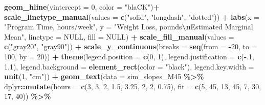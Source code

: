 \documentclass[
]{article}
\newenvironment{Shaded}{\begin{snugshade}}{\end{snugshade}}
\newcommand{\AttributeTok}[1]{\textcolor[rgb]{0.13,0.29,0.53}{#1}}
\newcommand{\ConstantTok}[1]{\textcolor[rgb]{0.56,0.35,0.01}{#1}}
\newcommand{\DecValTok}[1]{\textcolor[rgb]{0.00,0.00,0.81}{#1}}
\newcommand{\FloatTok}[1]{\textcolor[rgb]{0.00,0.00,0.81}{#1}}
\newcommand{\FunctionTok}[1]{\textcolor[rgb]{0.13,0.29,0.53}{\textbf{#1}}}
\newcommand{\NormalTok}[1]{#1}
\newcommand{\SpecialCharTok}[1]{\textcolor[rgb]{0.81,0.36,0.00}{\textbf{#1}}}
\newcommand{\StringTok}[1]{\textcolor[rgb]{0.31,0.60,0.02}{#1}}
\begin{document}
\begin{Shaded}
\begin{Highlighting}[]
  \FunctionTok{geom\_hline}\NormalTok{(}\AttributeTok{yintercept =} \DecValTok{0}\NormalTok{,}
             \AttributeTok{color =} \StringTok{"blaCK"}\NormalTok{)}\SpecialCharTok{+}
  \FunctionTok{scale\_linetype\_manual}\NormalTok{(}\AttributeTok{values =} \FunctionTok{c}\NormalTok{(}\StringTok{"solid"}\NormalTok{, }\StringTok{"longdash"}\NormalTok{, }\StringTok{"dotted"}\NormalTok{)) }\SpecialCharTok{+}
  \FunctionTok{labs}\NormalTok{(}\AttributeTok{x =} \StringTok{"Program Time, hours/week"}\NormalTok{,}
       \AttributeTok{y =} \StringTok{"Weight Loss, pounds}\SpecialCharTok{\textbackslash{}n}\StringTok{Estimated Marginal Mean"}\NormalTok{,}
       \AttributeTok{linetype =} \ConstantTok{NULL}\NormalTok{,}
       \AttributeTok{fill =} \ConstantTok{NULL}\NormalTok{)  }\SpecialCharTok{+}
  \FunctionTok{scale\_fill\_manual}\NormalTok{(}\AttributeTok{values =} \FunctionTok{c}\NormalTok{(}\StringTok{"gray20"}\NormalTok{, }\StringTok{"gray90"}\NormalTok{)) }\SpecialCharTok{+}
  \FunctionTok{scale\_y\_continuous}\NormalTok{(}\AttributeTok{breaks =} \FunctionTok{seq}\NormalTok{(}\AttributeTok{from =} \SpecialCharTok{{-}}\DecValTok{20}\NormalTok{, }\AttributeTok{to =} \DecValTok{100}\NormalTok{, }\AttributeTok{by =} \DecValTok{20}\NormalTok{)) }\SpecialCharTok{+}
  \FunctionTok{theme}\NormalTok{(}\AttributeTok{legend.position =} \FunctionTok{c}\NormalTok{(}\DecValTok{0}\NormalTok{, }\DecValTok{1}\NormalTok{),}
        \AttributeTok{legend.justification =} \FunctionTok{c}\NormalTok{(}\SpecialCharTok{{-}}\NormalTok{.}\DecValTok{1}\NormalTok{, }\FloatTok{1.1}\NormalTok{),}
        \AttributeTok{legend.background =} \FunctionTok{element\_rect}\NormalTok{(}\AttributeTok{color =} \StringTok{"black"}\NormalTok{),}
        \AttributeTok{legend.key.width =} \FunctionTok{unit}\NormalTok{(}\DecValTok{1}\NormalTok{, }\StringTok{"cm"}\NormalTok{)) }\SpecialCharTok{+}
  \FunctionTok{geom\_text}\NormalTok{(}\AttributeTok{data =}\NormalTok{ sim\_slopes\_M45 }\SpecialCharTok{\%\textgreater{}\%}
\NormalTok{              dplyr}\SpecialCharTok{::}\FunctionTok{mutate}\NormalTok{(}\AttributeTok{hours =} \FunctionTok{c}\NormalTok{(}\DecValTok{3}\NormalTok{, }\DecValTok{3}\NormalTok{, }\DecValTok{2}\NormalTok{, }\FloatTok{1.5}\NormalTok{, }
                                      \FloatTok{3.25}\NormalTok{, }\DecValTok{2}\NormalTok{, }\DecValTok{2}\NormalTok{, }\FloatTok{0.75}\NormalTok{),}
                            \AttributeTok{fit =} \FunctionTok{c}\NormalTok{(}\DecValTok{5}\NormalTok{, }\DecValTok{45}\NormalTok{, }\DecValTok{13}\NormalTok{, }\DecValTok{45}\NormalTok{,}
                                    \DecValTok{7}\NormalTok{, }\DecValTok{30}\NormalTok{, }\DecValTok{17}\NormalTok{, }\DecValTok{40}\NormalTok{)) }\SpecialCharTok{\%\textgreater{}\%} 

\end{Highlighting}
\end{Shaded}
\end{document}
